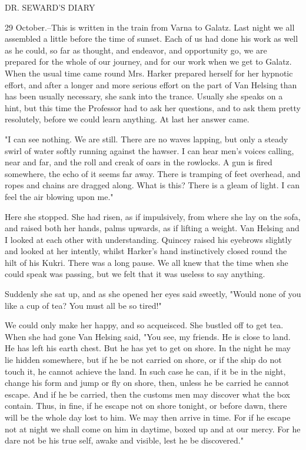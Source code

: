 DR. SEWARD'S DIARY 

29 October.--This is written in the train from Varna to Galatz. Last night we all assembled a little before the time of sunset. Each of us had done his work as well as he could, so far as thought, and endeavor, and opportunity go, we are prepared for the whole of our journey, and for our work when we get to Galatz. When the usual time came round Mrs. Harker prepared herself for her hypnotic effort, and after a longer and more serious effort on the part of Van Helsing than has been usually necessary, she sank into the trance. Usually she speaks on a hint, but this time the Professor had to ask her questions, and to ask them pretty resolutely, before we could learn anything. At last her answer came. 

"I can see nothing. We are still. There are no waves lapping, but only a steady swirl of water softly running against the hawser. I can hear men's voices calling, near and far, and the roll and creak of oars in the rowlocks. A gun is fired somewhere, the echo of it seems far away. There is tramping of feet overhead, and ropes and chains are dragged along. What is this? There is a gleam of light. I can feel the air blowing upon me." 

Here she stopped. She had risen, as if impulsively, from where she lay on the sofa, and raised both her hands, palms upwards, as if lifting a weight. Van Helsing and I looked at each other with understanding. Quincey raised his eyebrows slightly and looked at her intently, whilst Harker's hand instinctively closed round the hilt of his Kukri. There was a long pause. We all knew that the time when she could speak was passing, but we felt that it was useless to say anything. 

Suddenly she sat up, and as she opened her eyes said sweetly, "Would none of you like a cup of tea? You must all be so tired!" 

We could only make her happy, and so acqueisced. She bustled off to get tea. When she had gone Van Helsing said, "You see, my friends. He is close to land. He has left his earth chest. But he has yet to get on shore. In the night he may lie hidden somewhere, but if he be not carried on shore, or if the ship do not touch it, he cannot achieve the land. In such case he can, if it be in the night, change his form and jump or fly on shore, then, unless he be carried he cannot escape. And if he be carried, then the customs men may discover what the box contain. Thus, in fine, if he escape not on shore tonight, or before dawn, there will be the whole day lost to him. We may then arrive in time. For if he escape not at night we shall come on him in daytime, boxed up and at our mercy. For he dare not be his true self, awake and visible, lest he be discovered." 

